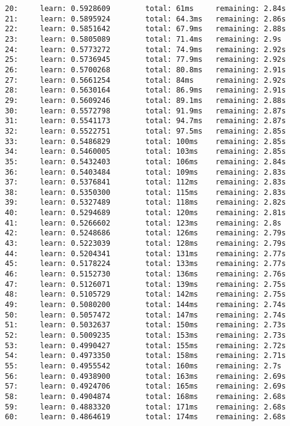 \documentclass[11pt]{article}
\begin{document}
\begin{Verbatim}[commandchars=\\\{\}]
20:     learn: 0.5928609        total: 61ms     remaining: 2.84s
21:     learn: 0.5895924        total: 64.3ms   remaining: 2.86s
22:     learn: 0.5851642        total: 67.9ms   remaining: 2.88s
23:     learn: 0.5805089        total: 71.4ms   remaining: 2.9s
24:     learn: 0.5773272        total: 74.9ms   remaining: 2.92s
25:     learn: 0.5736945        total: 77.9ms   remaining: 2.92s
26:     learn: 0.5700268        total: 80.8ms   remaining: 2.91s
27:     learn: 0.5661254        total: 84ms     remaining: 2.92s
28:     learn: 0.5630164        total: 86.9ms   remaining: 2.91s
29:     learn: 0.5609246        total: 89.1ms   remaining: 2.88s
30:     learn: 0.5572798        total: 91.9ms   remaining: 2.87s
31:     learn: 0.5541173        total: 94.7ms   remaining: 2.87s
32:     learn: 0.5522751        total: 97.5ms   remaining: 2.85s
33:     learn: 0.5486829        total: 100ms    remaining: 2.85s
34:     learn: 0.5460005        total: 103ms    remaining: 2.85s
35:     learn: 0.5432403        total: 106ms    remaining: 2.84s
36:     learn: 0.5403484        total: 109ms    remaining: 2.83s
37:     learn: 0.5376841        total: 112ms    remaining: 2.83s
38:     learn: 0.5350300        total: 115ms    remaining: 2.83s
39:     learn: 0.5327489        total: 118ms    remaining: 2.82s
40:     learn: 0.5294689        total: 120ms    remaining: 2.81s
41:     learn: 0.5266602        total: 123ms    remaining: 2.8s
42:     learn: 0.5248686        total: 126ms    remaining: 2.79s
43:     learn: 0.5223039        total: 128ms    remaining: 2.79s
44:     learn: 0.5204341        total: 131ms    remaining: 2.77s
45:     learn: 0.5178224        total: 133ms    remaining: 2.77s
46:     learn: 0.5152730        total: 136ms    remaining: 2.76s
47:     learn: 0.5126071        total: 139ms    remaining: 2.75s
48:     learn: 0.5105729        total: 142ms    remaining: 2.75s
49:     learn: 0.5080200        total: 144ms    remaining: 2.74s
50:     learn: 0.5057472        total: 147ms    remaining: 2.74s
51:     learn: 0.5032637        total: 150ms    remaining: 2.73s
52:     learn: 0.5009235        total: 153ms    remaining: 2.73s
53:     learn: 0.4990427        total: 155ms    remaining: 2.72s
54:     learn: 0.4973350        total: 158ms    remaining: 2.71s
55:     learn: 0.4955542        total: 160ms    remaining: 2.7s
56:     learn: 0.4938900        total: 163ms    remaining: 2.69s
57:     learn: 0.4924706        total: 165ms    remaining: 2.69s
58:     learn: 0.4904874        total: 168ms    remaining: 2.68s
59:     learn: 0.4883320        total: 171ms    remaining: 2.68s
60:     learn: 0.4864619        total: 174ms    remaining: 2.68s

\end{Verbatim}
\end{document}
